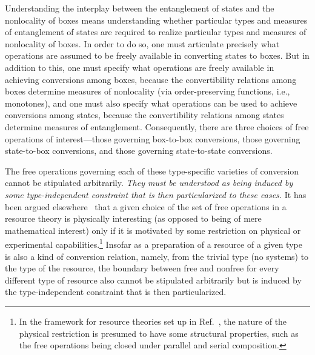 \documentclass[prx,11pt,letterpaper,twocolumn,accepted=2023-11-27]{quantumarticle}
\theoremstyle{plain}
\theoremstyle{definition}
\begin{document}
Understanding the interplay between the entanglement of states and the nonlocality of boxes means understanding whether particular types and measures of entanglement of states are required to realize particular types and measures of nonlocality of boxes.
 In order to do so, one must articulate precisely what operations are assumed to be freely available in converting states to boxes.
  But in addition to this, one must specify what operations are freely available in achieving conversions among boxes,
  because the convertibility relations among boxes
    determine measures of nonlocality (via order-preserving functions, i.e., monotones), and one must also specify what operations can be used to achieve conversions
   among states, because the convertibility relations among states 
   determine measures of entanglement.  Consequently, there are three choices of free operations of interest---those governing box-to-box conversions, those governing state-to-box conversions, and those governing state-to-state conversions.
 
The free operations governing each of these type-specific varieties of conversion cannot be stipulated arbitrarily.  {\em They must be understood as being induced by some type-independent constraint that is then particularized to these cases.}  It has been argued elsewhere~\cite{coecke2016mathematical,marvian2016quantify} that a given choice of the set of free operations in a resource theory is physically interesting (as opposed to being of mere mathematical interest) only if it is motivated by some restriction on physical or experimental capabilities.\footnote{In the framework for resource theories set up in Ref.~\cite{coecke2016mathematical}, the nature of the physical restriction is presumed to have some structural properties, such as the free operations being closed under parallel and serial composition.}  
Insofar as a preparation of a resource of a given type is also a kind of conversion relation, namely, from the trivial type  (no systems) to the type of the resource, the boundary between free and nonfree for every different type of resource also cannot be stipulated arbitrarily but is induced by the type-independent constraint that is then particularized.
 
\end{document}
